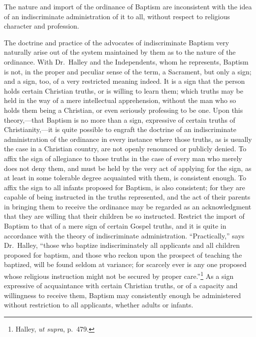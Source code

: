 \documentclass[
  english,
]{book}
\begin{document}
The nature and import of the ordinance of Baptism are inconsistent with the idea of an indiscriminate administration of it to all, without respect to religious character and profession.

The doctrine and practice of the advocates of indiscriminate Baptism very naturally arise out of the system maintained by them as to the nature of the ordinance. With Dr.~Halley and the Independents, whom he represents, Baptism is not, in the proper and peculiar sense of the term, a Sacrament, but only a sign; and a sign, too, of a very restricted meaning indeed. It is a sign that the person holds certain Christian truths, or is willing to learn them; which truths may be held in the way of a mere intellectual apprehension, without the man who so holds them being a Christian, or even seriously professing to be one. Upon this theory,---that Baptism is no more than a sign, expressive of certain truths of Christianity,---it is quite possible to engraft the doctrine of an indiscriminate administration of the ordinance in every instance where those truths, as is usually the case in a Christian country, are not openly renounced or publicly denied. To affix the sign of allegiance to those truths in the case of every man who merely does not deny them, and must be held by the very act of applying for the sign, as at least in some tolerable degree acquainted with them, is consistent enough. To affix the sign to all infants proposed for Baptism, is also consistent; for they are capable of being instructed in the truths represented, and the act of their parents in bringing them to receive the ordinance may be regarded as an acknowledgment that they are willing that their children be so instructed. Restrict the import of Baptism to that of a mere sign of certain Gospel truths, and it is quite in accordance with the theory of indiscriminate administration. ``Practically,'' says Dr.~Halley, ``those who baptize indiscriminately all applicants and all children proposed for baptism, and those who reckon upon the prospect of teaching the baptized, will be found seldom at variance; for scarcely ever is any one proposed whose religious instruction might not be secured by proper care.''\footnote{Halley, \emph{ut supra}, p.~479.} As a sign expressive of acquaintance with certain Christian truths, or of a capacity and willingness to receive them, Baptism may consistently enough be administered without restriction to all applicants, whether adults or infants.
\end{document}
